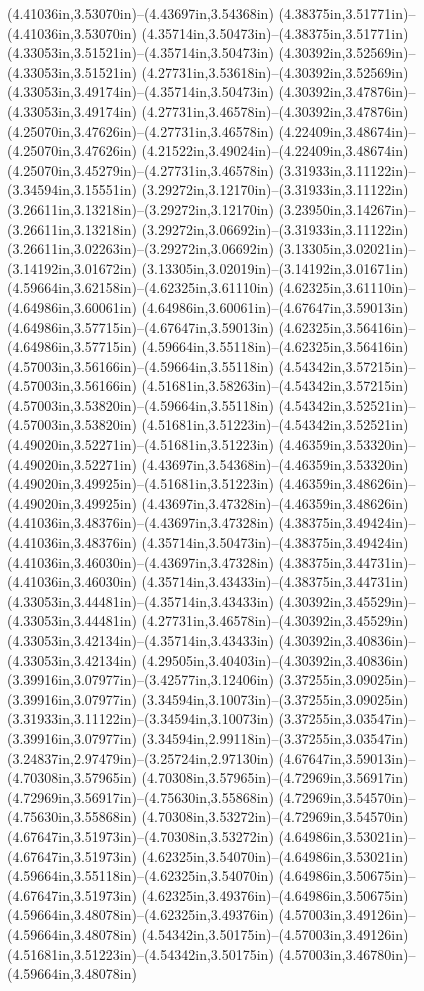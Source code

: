 (4.41036in,3.53070in)--(4.43697in,3.54368in) (4.38375in,3.51771in)--(4.41036in,3.53070in) (4.35714in,3.50473in)--(4.38375in,3.51771in) (4.33053in,3.51521in)--(4.35714in,3.50473in) (4.30392in,3.52569in)--(4.33053in,3.51521in) (4.27731in,3.53618in)--(4.30392in,3.52569in) (4.33053in,3.49174in)--(4.35714in,3.50473in) (4.30392in,3.47876in)--(4.33053in,3.49174in) (4.27731in,3.46578in)--(4.30392in,3.47876in) (4.25070in,3.47626in)--(4.27731in,3.46578in) (4.22409in,3.48674in)--(4.25070in,3.47626in) (4.21522in,3.49024in)--(4.22409in,3.48674in) (4.25070in,3.45279in)--(4.27731in,3.46578in) (3.31933in,3.11122in)--(3.34594in,3.15551in) (3.29272in,3.12170in)--(3.31933in,3.11122in) (3.26611in,3.13218in)--(3.29272in,3.12170in) (3.23950in,3.14267in)--(3.26611in,3.13218in) (3.29272in,3.06692in)--(3.31933in,3.11122in) (3.26611in,3.02263in)--(3.29272in,3.06692in) (3.13305in,3.02021in)--(3.14192in,3.01672in) (3.13305in,3.02019in)--(3.14192in,3.01671in) (4.59664in,3.62158in)--(4.62325in,3.61110in) (4.62325in,3.61110in)--(4.64986in,3.60061in) (4.64986in,3.60061in)--(4.67647in,3.59013in) (4.64986in,3.57715in)--(4.67647in,3.59013in) (4.62325in,3.56416in)--(4.64986in,3.57715in) (4.59664in,3.55118in)--(4.62325in,3.56416in) (4.57003in,3.56166in)--(4.59664in,3.55118in) (4.54342in,3.57215in)--(4.57003in,3.56166in) (4.51681in,3.58263in)--(4.54342in,3.57215in) (4.57003in,3.53820in)--(4.59664in,3.55118in) (4.54342in,3.52521in)--(4.57003in,3.53820in) (4.51681in,3.51223in)--(4.54342in,3.52521in) (4.49020in,3.52271in)--(4.51681in,3.51223in) (4.46359in,3.53320in)--(4.49020in,3.52271in) (4.43697in,3.54368in)--(4.46359in,3.53320in) (4.49020in,3.49925in)--(4.51681in,3.51223in) (4.46359in,3.48626in)--(4.49020in,3.49925in) (4.43697in,3.47328in)--(4.46359in,3.48626in) (4.41036in,3.48376in)--(4.43697in,3.47328in) (4.38375in,3.49424in)--(4.41036in,3.48376in) (4.35714in,3.50473in)--(4.38375in,3.49424in) (4.41036in,3.46030in)--(4.43697in,3.47328in) (4.38375in,3.44731in)--(4.41036in,3.46030in) (4.35714in,3.43433in)--(4.38375in,3.44731in) (4.33053in,3.44481in)--(4.35714in,3.43433in) (4.30392in,3.45529in)--(4.33053in,3.44481in) (4.27731in,3.46578in)--(4.30392in,3.45529in) (4.33053in,3.42134in)--(4.35714in,3.43433in) (4.30392in,3.40836in)--(4.33053in,3.42134in) (4.29505in,3.40403in)--(4.30392in,3.40836in) (3.39916in,3.07977in)--(3.42577in,3.12406in) (3.37255in,3.09025in)--(3.39916in,3.07977in) (3.34594in,3.10073in)--(3.37255in,3.09025in) (3.31933in,3.11122in)--(3.34594in,3.10073in) (3.37255in,3.03547in)--(3.39916in,3.07977in) (3.34594in,2.99118in)--(3.37255in,3.03547in) (3.24837in,2.97479in)--(3.25724in,2.97130in) (4.67647in,3.59013in)--(4.70308in,3.57965in) (4.70308in,3.57965in)--(4.72969in,3.56917in) (4.72969in,3.56917in)--(4.75630in,3.55868in) (4.72969in,3.54570in)--(4.75630in,3.55868in) (4.70308in,3.53272in)--(4.72969in,3.54570in) (4.67647in,3.51973in)--(4.70308in,3.53272in) (4.64986in,3.53021in)--(4.67647in,3.51973in) (4.62325in,3.54070in)--(4.64986in,3.53021in) (4.59664in,3.55118in)--(4.62325in,3.54070in) (4.64986in,3.50675in)--(4.67647in,3.51973in) (4.62325in,3.49376in)--(4.64986in,3.50675in) (4.59664in,3.48078in)--(4.62325in,3.49376in) (4.57003in,3.49126in)--(4.59664in,3.48078in) (4.54342in,3.50175in)--(4.57003in,3.49126in) (4.51681in,3.51223in)--(4.54342in,3.50175in) (4.57003in,3.46780in)--(4.59664in,3.48078in) 